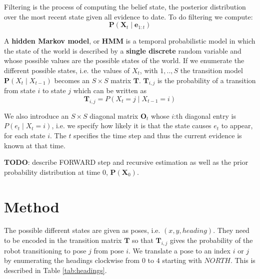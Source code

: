 \documentclass{article}
\begin{document}
Filtering is the process of computing the belief state, the posterior distribution over the most recent state given all evidence to date. To do filtering we compute:
\begin{displaymath}
\textbf{P}(\textbf{X}_t \mid \textbf{e}_{1:t})
\end{displaymath}

A \textbf{hidden Markov model}, or \textbf{HMM} is a temporal probabilistic model in which the state of the world is described by a \textbf{single discrete} random variable and whose possible values are the possible states of the world. If we enumerate the different possible states, i.e. the values of $X_t$, with $1,..,S$ the transition model $\textbf{P}(X_t \mid X_{t-1})$ becomes an $S \times S$ matrix $\textbf{T}$. $\textbf{T}_{i,j}$ is the probability of a transition from state $i$ to state $j$ which can be written as 
\begin{displaymath}
\textbf{T}_{i,j} = P(X_t = j \mid X_{t-1} = i)
\end{displaymath}

We also introduce an $S \times S$ diagonal matrix $\textbf{O}_t$ whose $i$:th diagonal entry is $P(e_t \mid X_t = i)$, i.e. we specify how likely it is that the state causes $e_t$ to appear, for each state $i$. The $t$ specifies the time step and thus the current evidence is known at that time.

\textbf{TODO}: describe FORWARD step and recursive estimation as well as the prior probability distribution at time 0, $\textbf{P}(\textbf{X}_0)$.

\section{Method}
The possible different states are given as poses, i.e. $(x,y,heading)$. They need to be encoded in the transition matrix $\textbf{T}$ so that $\textbf{T}_{i,j}$ gives the probability of the robot transitioning to pose $j$ from pose $i$. We translate a pose to an index $i$ or $j$ by enumerating the headings clockwise from $0$ to $4$ starting with $NORTH$. This is described in Table \ref{tab:headings}.
\end{document}
